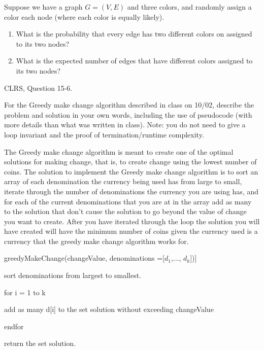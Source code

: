 \documentclass{article}
\begin{document}
\nextprob
Suppose we have a graph $G=(V,E)$ and three colors, and randomly assign a color
each node (where each color is equally likely).
\begin{enumerate}
    \item What is the probability that every edge has two different colors on
        assigned to its two nodes?
    \item What is the expected number of edges that have different colors
        assigned to its two nodes?
\end{enumerate}

\nextprob
CLRS, Question 15-6.

\nextprob
For the Greedy make change algorithm described in class on 10/02, describe the
problem and solution in your own words, including the use of pseudocode (with
more details than what was written in class).  Note: you do not need to give a
loop invariant and the proof of termination/runtime complexity.


The Greedy make change algorithm is meant to create one of the optimal solutions for making change, that is, to create change using the lowest number of coins. The solution to implement the Greedy make change algorithm is to sort an array of each denomination the currency being used has from large to small, iterate through the number of denominations the currency you are using has, and for each of the current denominations that you are at in the array add as many to the solution that don't cause the solution to go beyond the value of change you want to create. After you have iterated through the loop the solution you will have created will have the minimum number of coins given the currency used is a currency that the greedy make change algorithm works for. 


greedyMakeChange(changeValue, denominations ={[$d_1$,..., $d_k$]})]

sort denominations from largest to smallest.
 
for i = 1 to k

\quad 	add as many d{[i]} to the set solution without exceeding changeValue

endfor

return the set solution.
\end{document}
